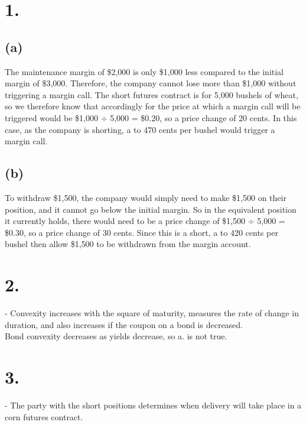 \documentclass{article}
\begin{document}
\thispagestyle{firstpageheader}
{\Large 

\section*{1.}

\subsection*{(a)} 

The maintenance margin of \$2,000 is only \$1,000 less compared to the initial margin of \$3,000. Therefore, the company cannot lose more than \$1,000 without triggering a margin call. The short futures contract is for 5,000 bushels of wheat, so we therefore know that accordingly for the price at which a margin call will be triggered would be \$1,000 \(\div\) 5,000 = \$0.20, so a price change of 20 cents. In this case, as the company is shorting, a  to 470 cents per bushel would trigger a margin call.

\subsection*{(b)}

To withdraw \$1,500, the company would simply need to make \$1,500 on their position, and it cannot go below the initial margin. So in the equivalent position it currently holds, there would need to be a price change of \$1,500 \(\div\) 5,000 = \$0.30, so a price change of 30 cents. Since this is a short, a  to 420 cents per bushel then allow \$1,500 to be withdrawn from the margin account.

}
{\Large 

\section*{2.}

 - Convexity increases with the square of maturity, measures the rate of change in duration, and also increases if the coupon on a bond is decreased. \\
Bond convexity decreases as yields decrease, so a. is not true.

}
{\Large 

\section*{3.}

 - The party with the short positions determines when delivery will take place in a corn futures contract.

}
\end{document}
